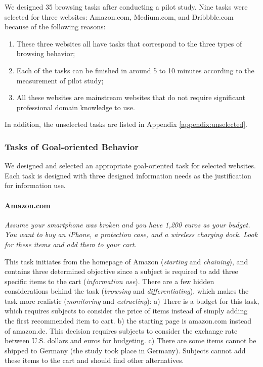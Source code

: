 We designed 35 browsing tasks after conducting a pilot study. 
Nine tasks were selected for three websites: Amazon.com, Medium.com, and Dribbble.com 
because of the following reasons:

\begin{enumerate}
    \item These three websites all have tasks that correspond to the three types of browsing behavior;
    \item Each of the tasks can be finished in around 5 to 10 minutes according to the measurement of pilot study;
    \item All these websites are mainstream websites that do not require 
        significant professional domain knowledge to use.
\end{enumerate}

In addition, the unselected tasks are listed in Appendix \ref{appendix:unselected}.

\subsubsection{Tasks of Goal-oriented Behavior}

We designed and selected an appropriate goal-oriented task for selected websites.
Each task is designed with three designed information needs as
the justification for information use.

\paragraph{Amazon.com} \emph{Assume your smartphone was broken and you have 1,200 euros 
    as your budget. You want to buy an iPhone, a protection case, and a wireless 
    charging dock. Look for these items and add them to your cart.}

This task initiates from the homepage of Amazon (\emph{starting} and \emph{chaining}), 
and contains three determined objective since 
a subject is required to add three specific items to the cart (\emph{information use}). 
There are a few hidden considerations behind the task (\emph{browsing} and \emph{differentiating}),
which makes the task more realistic (\emph{monitoring} and \emph{extracting}): 
a) There is a budget for this task, which requires subjects to consider the
price of items instead of simply adding the first recommended item to cart. 
b) the starting page is amazon.com instead of amazon.de. This decision requires
subjects to consider the exchange rate between U.S. dollars and euros for budgeting.
c) There are some items cannot be shipped to Germany (the study took place in Germany).
Subjects cannot add these items to the cart and should find other alternatives.

